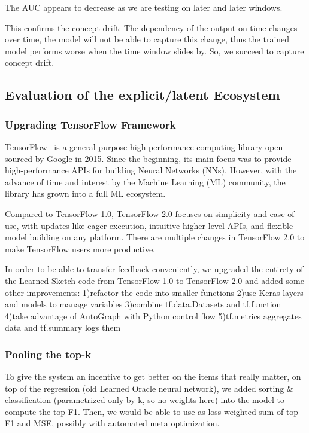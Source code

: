 The AUC appears to decrease as we are testing on later and later windows.

This confirms the concept drift: The dependency of the output on time changes over time, the model will not be able to capture this change, thus the trained model performs worse when the time window slides by. So, we succeed to capture concept drift. 


\subsection{Evaluation of the explicit/latent Ecosystem}

\subsubsection{Upgrading TensorFlow Framework}

TensorFlow~\cite{tensorflow2015-whitepaper} is a general-purpose high-performance computing library open-sourced by Google in 2015. Since the beginning, its main focus was to provide high-performance APIs for building Neural Networks (NNs). However, with the advance of time and interest by the Machine Learning (ML) community, the library has grown into a full ML ecosystem.

Compared to TensorFlow 1.0, TensorFlow 2.0 focuses on simplicity and ease of use, with updates like eager execution, intuitive higher-level APIs, and flexible model building on any platform. There are multiple changes in TensorFlow 2.0 to make TensorFlow users more productive.

In order to be able to transfer feedback conveniently, we upgraded the entirety of the Learned Sketch code from TensorFlow 1.0 to TensorFlow 2.0 and added some other improvements: 1)refactor the code into smaller functions 2)use Keras layers and models to manage variables 3)combine tf.data.Datasets and tf.function 4)take advantage of AutoGraph with Python control flow 5)tf.metrics aggregates data and tf.summary logs them 

\subsubsection{Pooling the top-k}

To give the system an incentive to get better on the items that really matter, on top of the regression (old Learned Oracle neural network), we added sorting \& classification  (parametrized only by k, so no weights here) into the model to compute the top F1. Then, we would be able to use as loss weighted sum of top F1 and MSE, possibly with automated meta optimization. 


